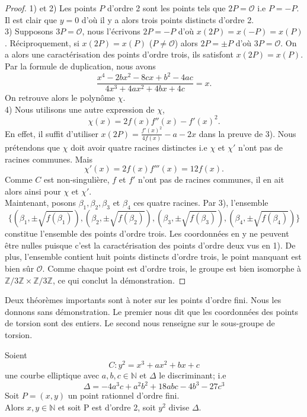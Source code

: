 \documentclass[a4paper]{article}
\begin{document}
\begin{proof}
1) et 2) Les points $P$ d'ordre 2 sont les points tels que $2P=\mathcal{O}$ i.e $P=-P$. Il est clair que $y=0$ d'où il y a alors trois points distincts d'ordre 2. \\
3) Supposons $3P=\mathcal{O}$, nous l'écrivons $2P=-P$
d'où $x(2P)=x(-P)=x(P)$. Réciproquement, si $x(2P)=x(P)$ ($P \neq \mathcal{O}$) alors $2P= \pm P$ d'où $3P=\mathcal{O}$. On a alors une caractérisation des points d'ordre trois, ils satisfont $x(2P)=x(P)$. Par la formule de duplication, nous avons
\begin{equation*}
\frac{x^4-2bx^2-8cx+b^2-4ac}{4x^3+4ax^2+4bx+4c}=x.
\end{equation*}
On retrouve alors le polynôme $\chi$. \\
4) Nous utilisons une autre expression de $\chi$,
\begin{equation*}
\chi(x)=2f(x)f''(x)-f'(x)^2.
\end{equation*}
En effet, il suffit d'utiliser $x(2P)=\frac{f'(x)^2}{4f(x)}-a-2x$ dans la preuve de 3). Nous prétendons que $\chi$ doit avoir quatre racines distinctes i.e $\chi$ et $\chi'$ n'ont pas de racines communes. Mais
\begin{equation*}
\chi'(x)=2f(x)f'''(x)=12f(x).
\end{equation*}
Comme $C$ est non-singulière, $f$ et $f'$ n'ont pas de racines communes, il en ait alors ainsi pour $\chi$ et $\chi'$. \\
Maintenant, posons $\beta_{1},\beta_{2},\beta_{3}$ et $\beta_{4}$ ces quatre racines. Par 3), l'ensemble
\begin{equation*}
\{(\beta_{1},\pm\sqrt{f(\beta_{1})}),(\beta_{2},\pm\sqrt{f(\beta_{2})}),(\beta_{3},\pm\sqrt{f(\beta_{3})}),(\beta_{4},\pm\sqrt{f(\beta_{4})})  \}
\end{equation*}
constitue l'ensemble des points d'ordre trois. Les coordonnées en y ne peuvent être nulles puisque c'est la caractérisation des points d'ordre deux vus en 1).
De plus, l'ensemble contient huit points distincts d'ordre trois, le point manquant est bien sûr $\mathcal{O}$. Comme chaque point est d'ordre trois, le groupe est bien isomorphe à $\mathbb{Z}/3\mathbb{Z} \times \mathbb{Z}/3\mathbb{Z}$, ce qui conclut la démonstration.
\end{proof}

\noindent Deux théorèmes importants sont à noter sur les points d'ordre fini. Nous les donnons sans démonstration. Le premier nous dit que les coordonnées des points de torsion sont des entiers. Le second nous renseigne sur le sous-groupe de torsion.
\begin{theorem}
Soient
\begin{equation*}
C:y^2=x^3+ax^2+bx+c
\end{equation*}
une courbe elliptique avec $a,b,c \in \mathbb{N}$ et $\Delta$ le discriminant; i.e
\begin{equation*}
\Delta=-4a^3c+a^2b^2+18abc-4b^3-27c^3
\end{equation*}
Soit $P=(x,y)$ un point rationnel d'ordre fini. \\
Alors $x,y \in \mathbb{N}$ et soit P est d'ordre 2, soit $y^2$ divise $\Delta$.
\end{theorem}
\end{document}

